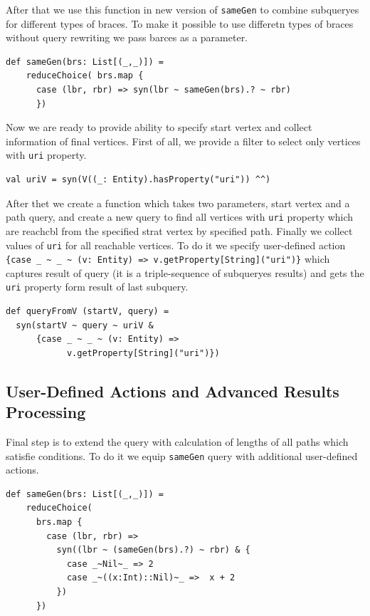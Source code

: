 After that we use this function in new version of \verb|sameGen| to combine subqueryes for different types of braces.
To make it possible to use differetn types of braces without query rewriting we pass barces as a parameter.

\begin{lstlisting}
def sameGen(brs: List[(_,_)]) =
    reduceChoice( brs.map {
      case (lbr, rbr) => syn(lbr ~ sameGen(brs).? ~ rbr)
      })
\end{lstlisting}

Now we are ready to provide ability to specify start vertex and collect information of final vertices.
First of all, we provide a filter to select only vertices with \verb|uri| property.

\begin{lstlisting}
val uriV = syn(V((_: Entity).hasProperty("uri")) ^^)
\end{lstlisting}

After thet we create a function which takes two parameters, start vertex and a path query, and create a new query to find all vertices with \verb|uri| property which are reachcbl from the specified strat vertex by specified path.
Finally we collect values of \verb|uri| for all reachable vertices.
To do it we specify user-defined action {\small \verb|{case _ ~ _ ~ (v: Entity) => v.getProperty[String]("uri")}|} which captures result of query (it is a triple-sequence of subqueryes results) and gets the \verb|uri| property form result of last subquery.

\begin{lstlisting}
def queryFromV (startV, query) =
  syn(startV ~ query ~ uriV &
      {case _ ~ _ ~ (v: Entity) =>
            v.getProperty[String]("uri")})
\end{lstlisting}


\subsection{User-Defined Actions and Advanced Results Processing}

Final step is to extend the query with calculation of lengths of all paths which satisfie conditions.
To do it we equip \verb|sameGen| query with additional user-defined actions.

\begin{lstlisting}
def sameGen(brs: List[(_,_)]) =
    reduceChoice(
      brs.map {
        case (lbr, rbr) =>
          syn((lbr ~ (sameGen(brs).?) ~ rbr) & {
            case _~Nil~_ => 2
            case _~((x:Int)::Nil)~_ =>  x + 2
          })
      })
\end{lstlisting}

